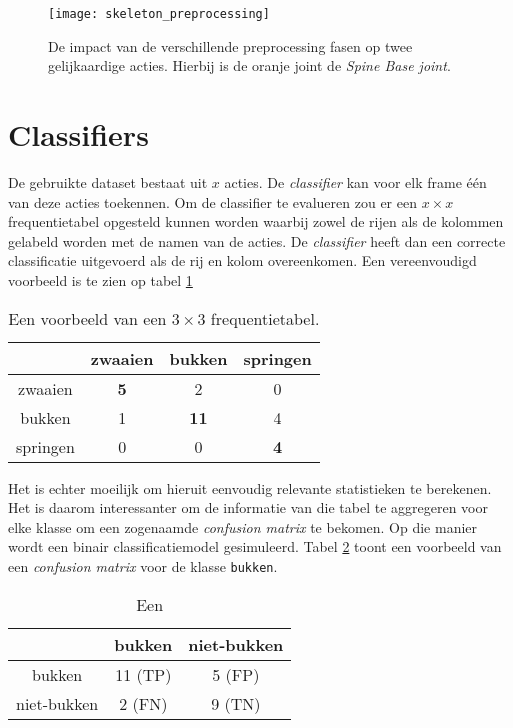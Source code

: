 \begin{figure}
	\texttt{[image: skeleton\_preprocessing]}
	\caption{De impact van de verschillende preprocessing fasen op twee gelijkaardige acties. Hierbij is de oranje joint de \textit{Spine Base joint}.}
	\label{fig:skeleton_preprocessing}
\end{figure}

\section{Classifiers}
\label{ch:evaluatie}
De gebruikte dataset bestaat uit $x$ acties. De \textit{classifier} kan voor elk frame één van deze acties toekennen. Om de classifier te evalueren zou er een $x \times x$ frequentietabel opgesteld kunnen worden waarbij zowel de rijen als de kolommen gelabeld worden met de namen van de acties. De \textit{classifier} heeft dan een correcte classificatie uitgevoerd als de rij en kolom overeenkomen. Een vereenvoudigd voorbeeld is te zien op tabel \ref{table:example_evaluation}
\begin{table}[ht]
	\centering
	\begin{tabular}{| c | ccc |}
		\hline
				& zwaaien & bukken & springen \\
				\hline
		zwaaien & \textbf{5} & 2 & 0 \\
		bukken & 1 & \textbf{11} & 4 \\
		springen & 0 & 0 & \textbf{4} \\
		\hline
		
	\end{tabular}
	\caption{Een voorbeeld van een $3 \times 3$ frequentietabel.}
	\label{table:example_evaluation}
\end{table}

Het is echter moeilijk om hieruit eenvoudig relevante statistieken te berekenen. Het is daarom interessanter om de informatie van die tabel te aggregeren voor elke klasse om een zogenaamde \textit{confusion matrix} te bekomen. Op die manier wordt een binair classificatiemodel gesimuleerd. Tabel \ref{table:example_evaluation_aggregate} toont een voorbeeld van een \textit{confusion matrix} voor de klasse \texttt{bukken}. 
\begin{table}[ht]
	\centering
	\begin{tabular}{| c | cc |}
		\hline
		& bukken & niet-bukken \\
		\hline
		bukken & 11 (TP) & 5 (FP) \\
		niet-bukken & 2 (FN) & 9 (TN)\\
		\hline
	\end{tabular}
	\caption{Een}
	\label{table:example_evaluation_aggregate}
\end{table}

